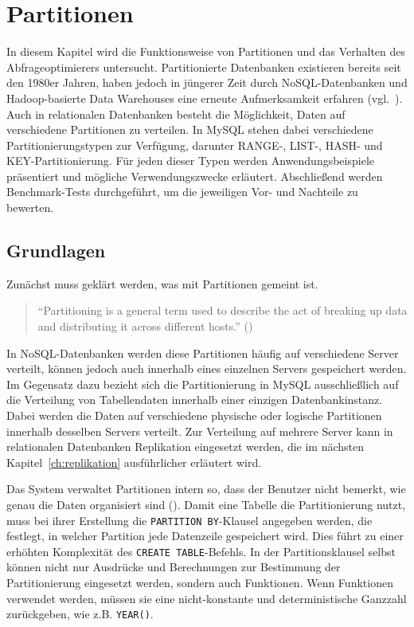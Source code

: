 
\chapter{Partitionen}\label{ch:partitions}

In diesem Kapitel wird die Funktionsweise von Partitionen und das Verhalten des Abfrageoptimierers untersucht.
Partitionierte Datenbanken existieren bereits seit den 1980er Jahren, haben jedoch in jüngerer Zeit durch NoSQL-Datenbanken und Hadoop-basierte Data Warehouses eine erneute Aufmerksamkeit erfahren (vgl.\ \cite[S. 200]{kleppmann2017designing}).
Auch in relationalen Datenbanken besteht die Möglichkeit, Daten auf verschiedene Partitionen zu verteilen.
In MySQL stehen dabei verschiedene Partitionierungstypen zur Verfügung, darunter RANGE-, LIST-, HASH- und KEY-Partitionierung.
Für jeden dieser Typen werden Anwendungsbeispiele präsentiert und mögliche Verwendungszwecke erläutert.
Abschließend werden Benchmark-Tests durchgeführt, um die jeweiligen Vor- und Nachteile zu bewerten.


\section{Grundlagen}\label{sec:partition-grundlagen}

Zunächst muss geklärt werden, was mit Partitionen gemeint ist.

\begin{quote}
	\enquote{Partitioning is a general term used to describe the act of breaking up data and distributing it across different hosts.} (\cite[S. 148]{da2015redis})
\end{quote}

In NoSQL-Datenbanken werden diese Partitionen häufig auf verschiedene Server verteilt, können jedoch auch innerhalb eines einzelnen Servers gespeichert werden.
Im Gegensatz dazu bezieht sich die Partitionierung in MySQL ausschließlich auf die Verteilung von Tabellendaten innerhalb einer einzigen Datenbankinstanz.
Dabei werden die Daten auf verschiedene physische oder logische Partitionen innerhalb desselben Servers verteilt.
Zur Verteilung auf mehrere Server kann in relationalen Datenbanken Replikation eingesetzt werden, die im nächsten Kapitel~\ref{ch:replikation} ausführlicher erläutert wird.

Das System verwaltet Partitionen intern so, dass der Benutzer nicht bemerkt, wie genau die Daten organisiert sind (\cite[S. 265--273]{schwartz2012high}).
Damit eine Tabelle die Partitionierung nutzt, muss bei ihrer Erstellung die \texttt{PARTITION BY}-Klausel angegeben werden, die festlegt, in welcher Partition jede Datenzeile gespeichert wird.
Dies führt zu einer erhöhten Komplexität des \texttt{CREATE TABLE}-Befehls.
In der Partitionsklausel selbst können nicht nur Ausdrücke und Berechnungen zur Bestimmung der Partitionierung eingesetzt werden, sondern auch Funktionen.
Wenn Funktionen verwendet werden, müssen sie eine nicht-konstante und deterministische Ganzzahl zurückgeben, wie z.B. \texttt{YEAR()}.

